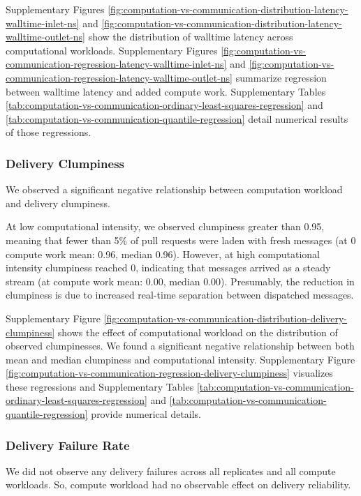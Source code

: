 Supplementary Figures \ref{fig:computation-vs-communication-distribution-latency-walltime-inlet-ns} and \ref{fig:computation-vs-communication-distribution-latency-walltime-outlet-ns} show the distribution of walltime latency across computational workloads.
Supplementary Figures \ref{fig:computation-vs-communication-regression-latency-walltime-inlet-ns} and \ref{fig:computation-vs-communication-regression-latency-walltime-outlet-ns} summarize regression between walltime latency and added compute work.
Supplementary Tables \ref{tab:computation-vs-communication-ordinary-least-squares-regression} and \ref{tab:computation-vs-communication-quantile-regression} detail numerical results of those regressions.

\subsubsection{Delivery Clumpiness}

We observed a significant negative relationship between computation workload and delivery clumpiness.

At low computational intensity, we observed clumpiness greater than 0.95, meaning that fewer than 5\% of pull requests were laden with fresh messages (at 0 compute work mean: 0.96, median 0.96).
However, at high computational intensity clumpiness reached 0, indicating that messages arrived as a steady stream (at  compute work mean: 0.00, median 0.00).
Presumably, the reduction in clumpiness is due to increased real-time separation between dispatched messages.

Supplementary Figure \ref{fig:computation-vs-communication-distribution-delivery-clumpiness} shows the effect of computational workload on the distribution of observed clumpinesses.
We found a significant negative relationship between both mean and median clumpiness and computational intensity.
Supplementary Figure \ref{fig:computation-vs-communication-regression-delivery-clumpiness} visualizes these regressions and Supplementary Tables \ref{tab:computation-vs-communication-ordinary-least-squares-regression} and \ref{tab:computation-vs-communication-quantile-regression} provide numerical details.

\subsubsection{Delivery Failure Rate}

We did not observe any delivery failures across all replicates and all compute workloads.
So, compute workload had no observable effect on delivery reliability.

